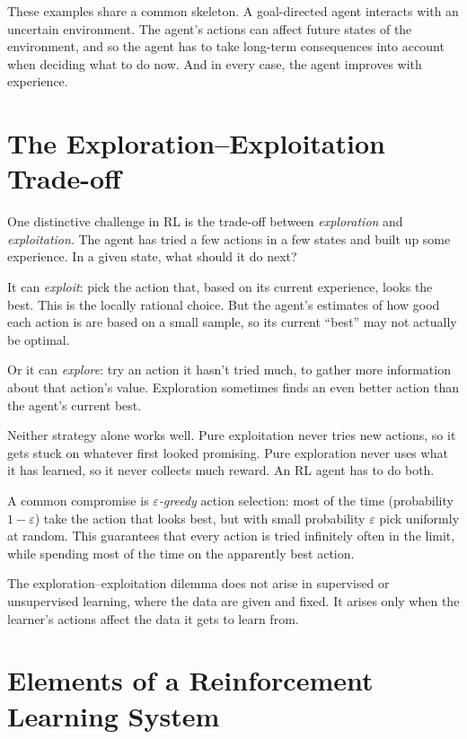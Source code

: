 \documentclass[../../book.tex]{subfiles}
\begin{document}
These examples share a common skeleton.  A goal-directed agent interacts with an uncertain environment.  The agent's actions can affect future states of the environment, and so the agent has to take long-term consequences into account when deciding what to do now.  And in every case, the agent improves with experience.

\section{The Exploration--Exploitation Trade-off}


One distinctive challenge in RL is the trade-off between \emph{exploration} and \emph{exploitation}.  The agent has tried a few actions in a few states and built up some experience.  In a given state, what should it do next?

It can \emph{exploit}: pick the action that, based on its current experience, looks the best.  This is the locally rational choice.  But the agent's estimates of how good each action is are based on a small sample, so its current ``best'' may not actually be optimal.

Or it can \emph{explore}: try an action it hasn't tried much, to gather more information about that action's value.  Exploration sometimes finds an even better action than the agent's current best.

Neither strategy alone works well.  Pure exploitation never tries new actions, so it gets stuck on whatever first looked promising.  Pure exploration never uses what it has learned, so it never collects much reward.  An RL agent has to do both.

A common compromise is \emph{$\varepsilon$-greedy} action selection: most of the time (probability $1-\varepsilon$) take the action that looks best, but with small probability $\varepsilon$ pick uniformly at random.  This guarantees that every action is tried infinitely often in the limit, while spending most of the time on the apparently best action.

The exploration--exploitation dilemma does not arise in supervised or unsupervised learning, where the data are given and fixed.  It arises only when the learner's actions affect the data it gets to learn from.

\section{Elements of a Reinforcement Learning System}
\end{document}
